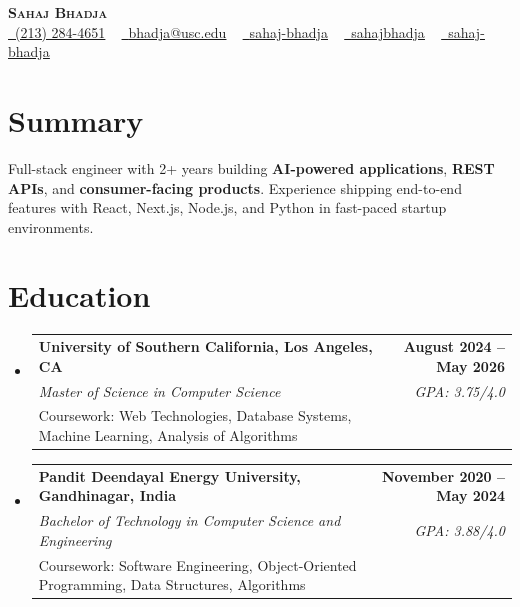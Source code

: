 \documentclass[letterpaper,10pt]{article}
\makeatletter
\newcommand{\resumeEduSubheading}[5]{\vspace{-1pt}\item\begin{tabular*}{1.0\textwidth}[t]{l@{\extracolsep{\fill}}r}\textbf{#1} & \textbf{\small #2} \\\textit{\small #3} & \textit{\small #4} \\\small #5 & \\\end{tabular*}\vspace{-4pt}}
\newcommand{\resumeSubHeadingListStart}{\begin{itemize}[leftmargin=0.0in, label={}]}
\newcommand{\resumeSubHeadingListEnd}{\end{itemize}}
\makeatother
\begin{document}
\begin{center}
{\Huge \scshape \textbf{Sahaj Bhadja}} \\ \vspace{1pt}
\small \href{tel:(213) 284-4651}{\faPhone\ \underline{(213) 284-4651}} ~ \href{mailto:bhadja@usc.edu}{\raisebox{-0.2\height}\faEnvelope\ \underline{bhadja@usc.edu}} ~
\href{https://www.linkedin.com/in/sahaj-bhadja/}{\raisebox{-0.2\height}\faLinkedin\ \underline{sahaj-bhadja}} ~ \href{https://github.com/SAHAJ-BHADJA}{\raisebox{-0.2\height}\faGithub\ \underline{sahajbhadja}} ~
\href{https://sahaj-bhadja.vercel.app/}{\raisebox{-0.2\height}\faGlobe\ \underline{sahaj-bhadja}}
\end{center}
\vspace{-18pt}
\section{Summary}
\begin{itemize}[leftmargin=0.15in, label={}]
\small{\item{Full-stack engineer with 2+ years building \textbf{AI-powered applications}, \textbf{REST APIs}, and \textbf{consumer-facing products}. Experience shipping end-to-end features with React, Next.js, Node.js, and Python in fast-paced startup environments.}}
\end{itemize}
\vspace{-16pt}
\section{Education}
\resumeSubHeadingListStart
\resumeEduSubheading{University of Southern California, Los Angeles, CA}{August 2024 -- May 2026}{Master of Science in Computer Science}{GPA: 3.75/4.0}{Coursework: Web Technologies, Database Systems, Machine Learning, Analysis of Algorithms}
\vspace{-9pt}
\resumeEduSubheading{Pandit Deendayal Energy University, Gandhinagar, India}{November 2020 -- May 2024}{Bachelor of Technology in Computer Science and Engineering}{GPA: 3.88/4.0}{Coursework: Software Engineering, Object-Oriented Programming, Data Structures, Algorithms}
\resumeSubHeadingListEnd
\vspace{-14pt}
\end{document}
